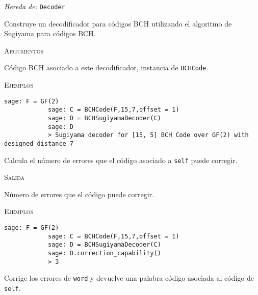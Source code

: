 \begin{description}[leftmargin=1em, font=\normalfont\ttfamily, style=nextline]
    \item[class BCHSugiyamaDecoder(self,code)]
    
    \emph{Hereda de: } \texttt{Decoder}

    Construye un decodificador para códigos BCH utilizando el algoritmo de Sugiyama para códigos BCH.

    \textsc{Argumentos}

    \begin{description}[font=\normalfont\ttfamily]
        \item[code] Código BCH asociado a este decodificador, instancia de \texttt{BCHCode}.
    \end{description}

    \textsc{Ejemplos}

\begin{lstlisting}[gobble=12]
            sage: F = GF(2)
            sage: C = BCHCode(F,15,7,offset = 1)
            sage: D = BCHSugiyamaDecoder(C)
            sage: D
            > Sugiyama decoder for [15, 5] BCH Code over GF(2) with designed distance 7
\end{lstlisting}

\begin{description}[font=\ttfamily,style=nextline]
    \item[correction\_capability(self)] Calcula el número de errores que el código asociado a \texttt{self} puede corregir.
    
    \textsc{Salida}

    \begin{description}[font=\normalfont\ttfamily]
        \item[] Número de errores que el código puede corregir.
    \end{description}
    
    \textsc{Ejemplos}

\begin{lstlisting}[gobble=12]
            sage: F = GF(2)
            sage: C = BCHCode(F,15,7,offset = 1)
            sage: D = BCHSugiyamaDecoder(C)
            sage: D.correction_capability()
            > 3
\end{lstlisting}

\end{description}
    
    \begin{description}[font=\ttfamily,style=nextline]
        \item[decode\_to\_code(self,word)] 
        Corrige los errores de \texttt{word} y devuelve una palabra código asociada al código de \texttt{self}.
        

\end{description}
\end{description}
